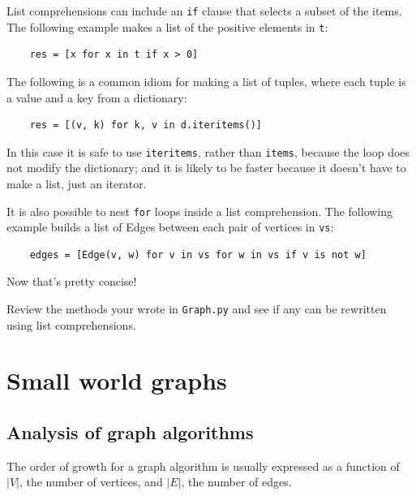 \documentclass[10pt]{book}
\begin{document}
List comprehensions can include an {\tt if} clause that selects a
subset of the items.  The following example makes a
list of the positive elements in {\tt t}:

\begin{verbatim}
    res = [x for x in t if x > 0]
\end{verbatim}

The following is a common idiom for making a list of tuples, where
each tuple is a value and a key from a dictionary:

\begin{verbatim}
    res = [(v, k) for k, v in d.iteritems()]
\end{verbatim}

In this case it is safe to use
{\tt iteritems}, rather than {\tt items}, because
the loop does not modify the dictionary; and it is likely to be
faster because it doesn't have to make a list, just an iterator.

It is also possible to nest {\tt for} loops inside
a list comprehension.  The following example builds a list
of Edges between each pair of vertices in {\tt vs}:

\begin{verbatim}
    edges = [Edge(v, w) for v in vs for w in vs if v is not w]
\end{verbatim}

Now that's pretty concise!

\begin{ex}

Review the methods your wrote in {\tt Graph.py} and see if any
can be rewritten using list comprehensions.

\end{ex}


\chapter{Small world graphs}

\section{Analysis of graph algorithms}

\newcommand{\V}{|V|}
\newcommand{\E}{|E|}

The order of growth for a graph algorithm is usually expressed
as a function of $\V$, the number of vertices, and $\E$, the number
of edges.
\end{document}
